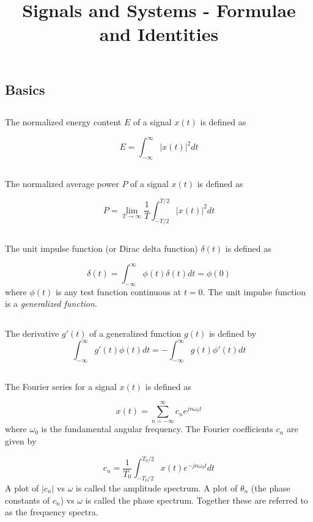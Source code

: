 \documentclass[]{article}
\title{Signals and Systems - Formulae and Identities}
\begin{document}
\maketitle

\begin{multicols}{2}
\section{Basics}
\subsection{}
The normalized energy content $E$ of a signal $x(t)$ is defined as

\[ E = \int_{-\infty}^{\infty} |x(t)|^{2}dt \]

\subsection{}
The normalized average power $P$ of a signal $x(t)$ is defined as

\[ P = \lim_{T \to \infty} \frac{1}{T} \int_{-T/2}^{T/2} |x(t)|^{2} dt \]

\subsection{}
The unit impulse function (or Dirac delta function) $\delta (t)$ is defined as

\[\delta (t) = \int_{-\infty}^{\infty} \phi(t) \delta (t)dt = \phi(0)\]
where $\phi (t) $ is any test function continuous at $t=0$. The unit impulse function is a \textit{generalized function}.

\subsection{}
The derivative $g'(t)$ of a generalized function $g(t)$ is defined by
\[\int_{-\infty}^{\infty} g'(t) \phi(t) dt = - \int_{-\infty}^{\infty} g(t) \phi '(t)dt\]

\subsection{}
The Fourier series for a signal $x(t)$ is defined as

\[ x(t) = \sum_{n=-\infty}^{\infty} c_{n} e^{jn\omega_{0} t} \]
where $\omega_{0}$ is the fundamental angular frequency.
The Fourier coefficients $c_{n}$ are given by

\[ c_{n} = \frac{1}{T_{0}} \int_{-T_{0}/2}^{T_{0}/2} x(t) e^{-jn\omega_{0}t} dt \]
A plot of $|c_{n}|$ vs $\omega$ is called the amplitude spectrum. A plot of $\theta_{n}$ (the phase constants of $c_{n}$) vs $\omega$ is called the phase spectrum. Together these are referred to as the frequency spectra.

\end{multicols}
\end{document}
